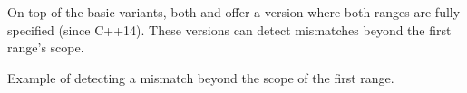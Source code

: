 On top of the basic variants, both  and  offer a version where both ranges are fully specified (since C++14). These versions can detect mismatches beyond the first range's scope.


\begin{box-note}
\footnotesize Example of detecting a mismatch beyond the scope of the first range.
\tcblower
{}
\end{box-note}